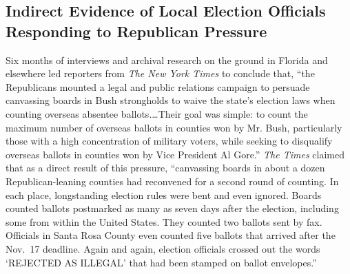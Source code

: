 \documentclass[11pt,titlepage]{article}
\begin{document}
\subsection{Indirect Evidence of Local Election Officials Responding
  to Republican Pressure}

Six months of interviews and archival research on the ground in
Florida and elsewhere led reporters from \emph{The New York Times} to
conclude that, ``the Republicans mounted a legal and public relations
campaign to persuade canvassing boards in Bush strongholds to waive
the state's election laws when counting overseas absentee
ballots.\ldots Their goal was simple: to count the maximum number of
overseas ballots in counties won by Mr.  Bush, particularly those with
a high concentration of military voters, while seeking to disqualify
overseas ballots in counties won by Vice President Al Gore.''
\emph{The Times} claimed that as a direct result of this pressure,
``canvassing boards in about a dozen Republican-leaning counties had
reconvened for a second round of counting.  In each place,
longstanding election rules were bent and even ignored.  Boards
counted ballots postmarked as many as seven days after the election,
including some from within the United States.  They counted two
ballots sent by fax.  Officials in Santa Rosa County even counted five
ballots that arrived after the Nov.\ 17 deadline.  Again and again,
election officials crossed out the words `REJECTED AS ILLEGAL' that
had been stamped on ballot envelopes.''
\end{document}

